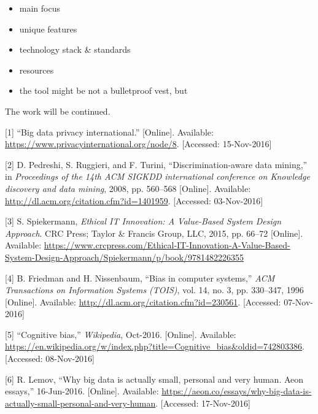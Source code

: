 \documentclass[12pt,english,a4paper,titlepage,cleardoublepage=empty,dottedtoc]{report}
\providecommand{\tightlist}{%
  \setlength{\itemsep}{0pt}\setlength{\parskip}{0pt}}
\begin{document}
\begin{itemize}
\tightlist
\item
  main focus
\item
  unique features
\item
  technology stack \& standards
\item
  resources
\item
  the tool might be not a bulletproof vest, but
\end{itemize}

The work will be continued.

\hypertarget{refs}{}
\hypertarget{ref-web_2016_privacy-international-about-big-data}{}
{[}1{]} ``Big data privacy international.'' {[}Online{]}. Available:
\url{https://www.privacyinternational.org/node/8}. {[}Accessed:
15-Nov-2016{]}

\hypertarget{ref-paper_2008_discrimination-aware-data-mining}{}
{[}2{]} D. Pedreshi, S. Ruggieri, and F. Turini, ``Discrimination-aware
data mining,'' in \emph{Proceedings of the 14th ACM SIGKDD international
conference on Knowledge discovery and data mining}, 2008, pp. 560--568
{[}Online{]}. Available:
\url{http://dl.acm.org/citation.cfm?id=1401959}. {[}Accessed:
03-Nov-2016{]}

\hypertarget{ref-book_2015_ethical-it-innovation_ethical-uses-of-information-and-knowledge}{}
{[}3{]} S. Spiekermann, \emph{Ethical IT Innovation: A Value-Based
System Design Approach}. CRC Press; Taylor \& Francis Group, LLC, 2015,
pp. 66--72 {[}Online{]}. Available:
\url{https://www.crcpress.com/Ethical-IT-Innovation-A-Value-Based-System-Design-Approach/Spiekermann/p/book/9781482226355}

\hypertarget{ref-paper_1996_bias-in-computer-systems}{}
{[}4{]} B. Friedman and H. Nissenbaum, ``Bias in computer systems,''
\emph{ACM Transactions on Information Systems (TOIS)}, vol. 14, no. 3,
pp. 330--347, 1996 {[}Online{]}. Available:
\url{http://dl.acm.org/citation.cfm?id=230561}. {[}Accessed:
07-Nov-2016{]}

\hypertarget{ref-wikipedia_2016_cognitive-bias}{}
{[}5{]} ``Cognitive bias,'' \emph{Wikipedia}, Oct-2016. {[}Online{]}.
Available:
\url{https://en.wikipedia.org/w/index.php?title=Cognitive_bias\&oldid=742803386}.
{[}Accessed: 08-Nov-2016{]}

\hypertarget{ref-web_2016_big-data-is-people}{}
{[}6{]} R. Lemov, ``Why big data is actually small, personal and very
human. Aeon essays,'' 16-Jun-2016. {[}Online{]}. Available:
\url{https://aeon.co/essays/why-big-data-is-actually-small-personal-and-very-human}.
{[}Accessed: 17-Nov-2016{]}
\end{document}
